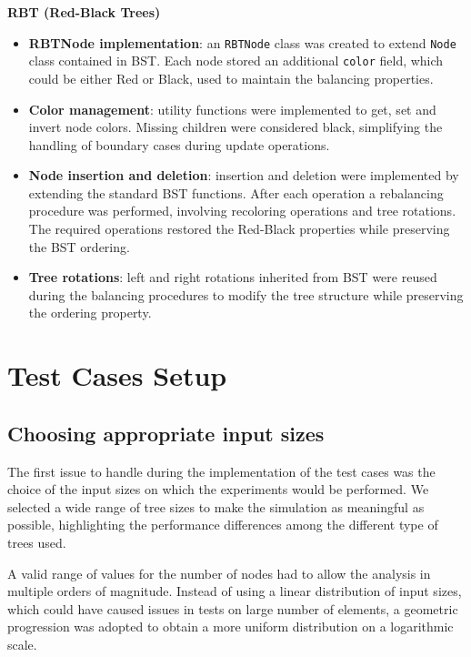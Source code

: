 \documentclass[12pt,a4paper]{article}
\begin{document}
        \textbf{RBT (Red-Black Trees)}
            \begin{itemize}
                \item \textbf{RBTNode implementation}: an \texttt{RBTNode} class was created to extend \texttt{Node} class contained in BST. Each node stored an additional \texttt{color} field, which could be either Red or Black, used to maintain the balancing properties.
                \item \textbf{Color management}: utility functions were implemented to get, set and invert node colors. Missing children were considered black, simplifying the handling of boundary cases during update operations.
                \item \textbf{Node insertion and deletion}: insertion and deletion were implemented by extending the standard BST functions. After each operation a rebalancing procedure was performed, involving recoloring operations and tree rotations. The required operations restored the Red-Black properties while preserving the BST ordering.
                \item \textbf{Tree rotations}: left and right rotations inherited from BST were reused during the balancing procedures to modify the tree structure while preserving the ordering property.
            \end{itemize}

    \newpage

    \section{Test Cases Setup}

        \subsection{Choosing appropriate input sizes}

            The first issue to handle during the implementation of the test cases was the choice of the input sizes on which the experiments would be performed. We selected a wide range of tree sizes to make the simulation as meaningful as possible, highlighting the performance differences among the different type of trees used.
            
            A valid range of values for the number of nodes had to allow the analysis in multiple orders of magnitude. Instead of using a linear distribution of input sizes, which could have caused issues in tests on large number of elements, a geometric progression was adopted to obtain a more uniform distribution on a logarithmic scale.
           
\end{document}
